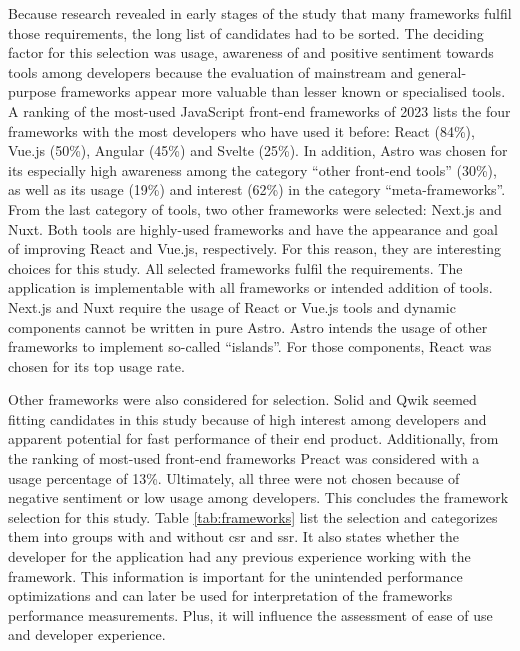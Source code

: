 \documentclass[a4paper, 10pt]{article}
\begin{document}
Because research revealed in early stages of the study that many frameworks fulfil those requirements, the long list of candidates had to be sorted.
The deciding factor for this selection was usage, awareness of and positive sentiment towards tools among developers because the evaluation of mainstream and general-purpose frameworks appear more valuable than lesser known or specialised tools.
A ranking of the most-used JavaScript front-end frameworks of 2023 \citep{stateOfJs2023} lists the four frameworks with the most developers who have used it before: React (84\%), Vue.js (50\%), Angular (45\%) and Svelte (25\%).
In addition, Astro was chosen for its especially high awareness among the category \enquote{other front-end tools} (30\%), as well as its usage (19\%) and interest (62\%) in the category \enquote{meta-frameworks}.
From the last category of tools, two other frameworks were selected: Next.js and Nuxt.
Both tools are highly-used frameworks and have the appearance and goal of improving React and Vue.js, respectively.
For this reason, they are interesting choices for this study.
All selected frameworks fulfil the requirements.
The application is implementable with all frameworks or intended addition of tools.
Next.js and Nuxt require the usage of React or Vue.js tools and dynamic components cannot be written in pure Astro. %
Astro intends the usage of other frameworks to implement so-called \enquote{islands}.
For those components, React was chosen for its top usage rate.

Other frameworks were also considered for selection.
Solid and Qwik seemed fitting candidates  in this study because of high interest among developers and apparent potential for fast performance of their end product.
Additionally, from the ranking of most-used front-end frameworks Preact was considered with a usage percentage of 13\%.
Ultimately, all three were not chosen because of negative sentiment or low usage among developers.
This concludes the framework selection for this study.
Table \ref{tab:frameworks} list the selection and categorizes them into groups with and without \acrshort{csr} and \acrshort{ssr}.
It also states whether the developer for the application had any previous experience working with the framework.
This information is important for the unintended performance optimizations and can later be used for interpretation of the frameworks performance measurements.
Plus, it will influence the assessment of ease of use and developer experience.
\end{document}

